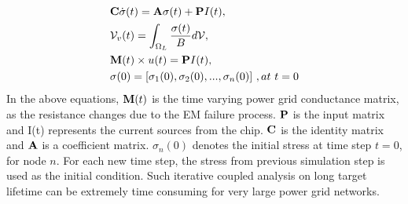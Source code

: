 \begin{align}
	\label{eq:em}
	\begin{split}
		&{\bf C} \dot{\sigma}(t)  = {\bf A} \sigma(t) + {\bf P}I(t),  \\
		&\mathcal{V}_v(t)  = \int_{\Omega_L}\frac{\sigma(t)}{B}d\mathcal{V},  \\ 
		&{\bf M}(t) \times u(t)  = {\bf P} I(t), \\
		&{\bf \sigma}(0)  = [\sigma_1(0), \sigma_2(0), ..., \sigma_n(0)] \,\, ,at \,\, t = 0 
	\end{split}
\end{align}
In the above equations, ${\bf M}(t)$ is the time varying power grid conductance matrix, as the resistance changes due to the EM failure process. ${{\bf P}}$ is the input matrix and I(t) represents the current sources from the chip. ${{\bf C}}$ is the identity matrix and ${{\bf A}}$ is a coefficient matrix. $\sigma_{n}(0)$ denotes the initial stress at time step $t = 0$, for node $n$. For each new time step, the stress from previous simulation step is used as the initial condition. Such iterative coupled analysis on long target lifetime can be extremely time consuming for very large power grid networks.



